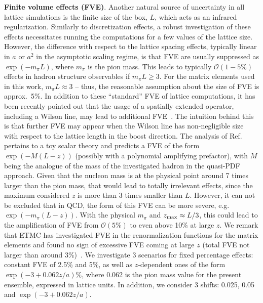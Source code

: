 \textbf{Finite volume effects (FVE)}. Another natural source of uncertainty in
all lattice simulations is the finite size of the box, $L$, which acts as an
infrared regularization. Similarly to discretization effects, a robust
investigation of these effects necessitates running the computations for a few
values of the lattice size. However, the difference with respect to the lattice
spacing effects, typically linear in $a$ or $a^2$ in the asymptotic scaling
regime, is that FVE are usually suppressed as $\exp(-m_\pi L)$, where $m_\pi$ is
the pion mass. This leads to typically $\mathcal{O}(1-5\%)$ effects in hadron
structure observables if $m_\pi L\geq 3$. For the matrix elements used in this
work, $m_\pi L\approx3$ -- thus, the reasonable assumption about the size of FVE
is approx.\ 5\%. In addition to these ``standard'' FVE of lattice computations,
it has been recently pointed out that the usage of a spatially extended
operator, including a Wilson line, may lead to additional
FVE~\cite{Briceno:2018lfj}. The intuition behind this is that further FVE may
appear when the Wilson line has non-negligible size with respect to the lattice
length in the boost direction. The analysis of Ref.~\cite{Briceno:2018lfj}
pertains to a toy scalar theory and predicts a FVE of the form $\exp(-M (L-z))$
(possibly with a polynomial amplifying prefactor), with $M$ being the analogue
of the mass of the investigated hadron in the quasi-PDF approach. Given that the
nucleon mass is at the physical point around 7 times larger than the pion mass,
that would lead to totally irrelevant effects, since the maximum considered $z$
is more than 3 times smaller than $L$. However, it can not be excluded that in
QCD, the form of this FVE can be more severe, e.g.\ $\exp(-m_\pi (L-z))$. With
the physical $m_\pi$ and $z_{\rm max}\approx L/3$, this could lead to the
amplification of FVE from $\mathcal{O}(5\%)$ to even above 10\% at large $z$. We
remark that ETMC has investigated FVE in the renormalization functions for the
matrix elements and found no sign of excessive FVE coming at large $z$ (total
FVE not larger than around 3\%)~\cite{Alexandrou:2019lfo}. We investigate 3
scenarios for fixed percentage effects: constant FVE of 2.5\% and 5\%, as well
as $z$-dependent ones of the form $\exp(-3+0.062z/a)\%$, where 0.062 is the pion
mass value for the present ensemble, expressed in lattice units. In addition, we
consider 3 shifts: 0.025, 0.05 and $\exp(-3+0.062z/a)$.

